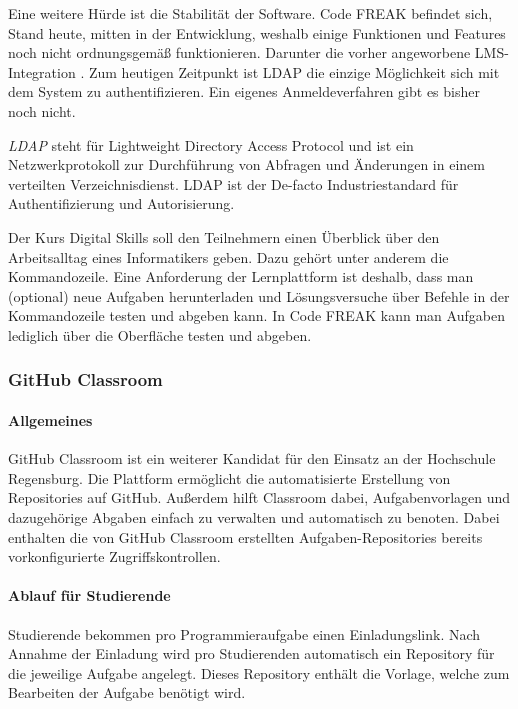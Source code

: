 Eine weitere Hürde ist die Stabilität der Software. Code FREAK befindet sich,
Stand heute, mitten in der Entwicklung, weshalb einige Funktionen und Features
noch nicht ordnungsgemäß funktionieren. Darunter die vorher angeworbene
LMS-Integration \parencite{codefreak-docs}. Zum heutigen Zeitpunkt ist LDAP die
einzige Möglichkeit sich mit dem System zu authentifizieren. Ein eigenes
Anmeldeverfahren gibt es bisher noch nicht.

\emph{LDAP} steht für Lightweight Directory Access Protocol und ist ein
Netzwerkprotokoll zur Durchführung von Abfragen und Änderungen in einem 
verteilten Verzeichnisdienst. LDAP ist der De-facto Industriestandard für
Authentifizierung und Autorisierung. \parencite{ldap}

Der Kurs Digital Skills soll den Teilnehmern einen Überblick über den
Arbeitsalltag eines Informatikers geben. Dazu gehört unter anderem die
Kommandozeile. Eine Anforderung der Lernplattform ist deshalb, dass man
(optional) neue Aufgaben herunterladen und Lösungsversuche über Befehle in der
Kommandozeile testen und abgeben kann. In Code FREAK kann man Aufgaben lediglich
über die Oberfläche testen und abgeben.

\newpage
\subsubsection{GitHub Classroom}
\paragraph{Allgemeines}
GitHub Classroom ist ein weiterer Kandidat für den Einsatz an der
Hochschule Regensburg. Die Plattform ermöglicht die automatisierte
Erstellung von Repositories auf GitHub. Außerdem hilft Classroom dabei,
Aufgabenvorlagen und dazugehörige Abgaben einfach zu verwalten und automatisch
zu benoten. Dabei enthalten die von GitHub Classroom erstellten
Aufgaben-Repositories bereits vorkonfigurierte Zugriffskontrollen. \parencite{github-classroom-startseite}

\paragraph{Ablauf für Studierende}
Studierende bekommen pro Programmieraufgabe einen Einladungslink. Nach Annahme
der Einladung wird pro Studierenden automatisch ein Repository für die jeweilige
Aufgabe angelegt. Dieses Repository enthält die Vorlage, welche zum Bearbeiten
der Aufgabe benötigt wird.

